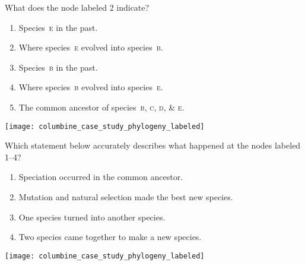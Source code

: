 \documentclass[t,handout]{beamer}  %
\newcommand{\ques}[1]{\highlight{\textsc{q#1:}}}
\begin{document}
%
{
\begin{frame}[t]{\ques4  What does the node labeled 2 indicate?}
	
	\begin{multicols}{2}
	\begin{enumerate}
		\item Species~\textsc{e} in the past.
		
		\item Where species~\textsc{e} evolved into species~\textsc{b}.
		
		\item Species~\textsc{b} in the past.

		\item Where species~\textsc{b} evolved into species~\textsc{e}.


		\item \alert<2>{The common ancestor of species~\textsc{b}, \textsc{c}, \textsc{d}, \& \textsc{e}.}

	\end{enumerate}
	
	\columnbreak
	
		\hfill \texttt{[image: columbine\_case\_study\_phylogeny\_labeled]}
	\end{multicols}
		
\end{frame}
}
%
\begin{frame}[t]{\ques5 Which statement below accurately describes what happened at the nodes labeled 1–4?}

	\begin{multicols}{2}
	\begin{enumerate}
		\item \alert<2>{Speciation occurred in the common ancestor.}
		
		\item Mutation and natural selection made the best new species.  
		
		\item One species turned into another species.
		
		\item Two species came together to make a new species.
	\end{enumerate}
	
	\columnbreak
	
	\hfill \texttt{[image: columbine\_case\_study\_phylogeny\_labeled]}
	\end{multicols}
		
\end{frame}
\end{document}
